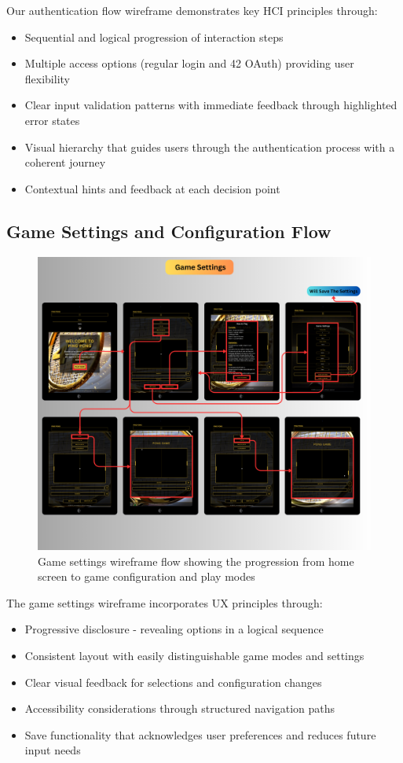 Our authentication flow wireframe demonstrates key HCI principles through:
\begin{itemize}
    \item Sequential and logical progression of interaction steps
    \item Multiple access options (regular login and 42 OAuth) providing user flexibility
    \item Clear input validation patterns with immediate feedback through highlighted error states
    \item Visual hierarchy that guides users through the authentication process with a coherent journey
    \item Contextual hints and feedback at each decision point
\end{itemize}

\subsection{Game Settings and Configuration Flow}

\begin{figure}[H]
    \centering
    \includegraphics[width=0.9\linewidth]{Figures/images/wireframes/2.png}
    \caption{Game settings wireframe flow showing the progression from home screen to game configuration and play modes}
    \label{fig:wireframe-game-settings}
\end{figure}

The game settings wireframe incorporates UX principles through:
\begin{itemize}
    \item Progressive disclosure - revealing options in a logical sequence
    \item Consistent layout with easily distinguishable game modes and settings
    \item Clear visual feedback for selections and configuration changes
    \item Accessibility considerations through structured navigation paths
    \item Save functionality that acknowledges user preferences and reduces future input needs
\end{itemize}

